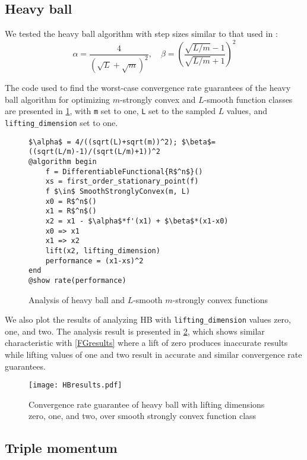 \subsection*{Heavy ball}

We tested the heavy ball algorithm with step sizes similar to that used in \cite{tutorial}:
\[
\alpha = \frac{4}{\left( \sqrt{L} + \sqrt{m} \right)^2}, \quad
\beta = \left( \frac{\sqrt{L/m} - 1}{\sqrt{L/m} + 1} \right)^2
\]

The code used to find the worst-case convergence rate guarantees of the heavy ball algorithm for optimizing $m$-strongly convex and $L$-smooth function classes are presented in \cref{hb_code}, with \texttt{m} set to one, \texttt{L} set to the sampled $L$ values, and \texttt{lifting\_dimension} set to one.

\begin{figure}[h!]
	\begin{lstlisting}[mathescape]
$\alpha$ = 4/((sqrt(L)+sqrt(m))^2); $\beta$=((sqrt(L/m)-1)/(sqrt(L/m)+1))^2
@algorithm begin
    f = DifferentiableFunctional{R$^n$}()
    xs = first_order_stationary_point(f)
    f $\in$ SmoothStronglyConvex(m, L)
    x0 = R$^n$()
    x1 = R$^n$()
    x2 = x1 - $\alpha$*f'(x1) + $\beta$*(x1-x0)
    x0 => x1
    x1 => x2
    lift(x2, lifting_dimension)
    performance = (x1-xs)^2
end
@show rate(performance)
\end{lstlisting}
\caption{Analysis of heavy ball and $L$-smooth $m$-strongly convex functions}
\label{hb_code}
\end{figure}

We also plot the results of analyzing HB with \texttt{lifting\_dimension} values zero, one, and two. The analysis result is presented in \cref{HBresults}, which shows similar characteristic with \cref{FGresults} where a lift of zero produces inaccurate results while lifting values of one and two result in accurate and similar convergence rate guarantees.

\begin{figure}[h]
    \centering
    \texttt{[image: HBresults.pdf]}
    \caption{Convergence rate guarantee of heavy ball with lifting dimensions zero, one, and two, over smooth strongly convex function class}
    \label{HBresults}
\end{figure}

\subsection*{Triple momentum}

